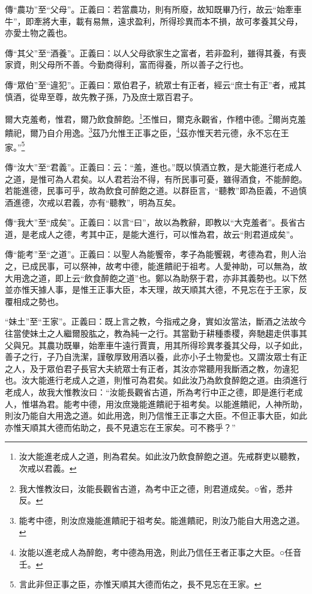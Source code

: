 {\noindent\zhuan{}\fzbyks 傳“農功”至“父母”。正義曰：若當農功，則有所廢，故知既畢乃行，故云“始牽車牛”，即牽將大車，載有易無，遠求盈利，所得珍異而本不損，故可孝養其父母，亦愛土物之義也。 \par}

{\noindent\zhuan{}\fzbyks 傳“其父”至“酒養”。正義曰：以人父母欲家生之富者，若非盈利，雖得其養，有喪家資，則父母所不善。今勤商得利，富而得養，所以善子之行也。 \par}

{\noindent\zhuan{}\fzbyks 傳“眾伯”至“違犯”。正義曰：眾伯君子，統眾士有正者，經云“庶士有正”者，戒其慎酒，從卑至尊，故先教子孫，乃及庶士眾百君子。 \par}

爾大克羞耇，惟君，爾乃飲食醉飽。\footnote{汝大能進老成人之道，則為君矣。如此汝乃飲食醉飽之道。先戒群吏以聽教，次戒以君義。}丕惟曰，爾克永觀省，作稽中德。\footnote{我大惟教汝曰，汝能長觀省古道，為考中正之德，則君道成矣。○省，悉井反。}爾尚克羞饋祀，爾乃自介用逸。\footnote{能考中德，則汝庶幾能進饋祀于祖考矣。能進饋祀，則汝乃能自大用逸之道。}茲乃允惟王正事之臣，\footnote{汝能以進老成人為醉飽，考中德為用逸，則此乃信任王者正事之大臣。○任音壬。}茲亦惟天若元德，永不忘在王家。”\footnote{言此非但正事之臣，亦惟天順其大德而佑之，長不見忘在王家。}

{\noindent\zhuan{}\fzbyks 傳“汝大”至“君義”。正義曰：云：“羞，進也。”既以慎酒立教，是大能進行老成人之道，是惟可為人君矣。以人君若治不得，有所民事可憂，雖得酒食，不能醉飽。若能進德，民事可乎，故為飲食可醉飽之道。以群臣言，“聽教”即為臣義，不過慎酒進德，次戒以君義，亦有“聽教”，明為互矣。 \par}

{\noindent\zhuan{}\fzbyks 傳“我大”至“成矣”。正義曰：以言“曰”，故以為教辭，即教以“大克羞者”。長省古道，是老成人之德，考其中正，是能大進行，可以惟為君，故云“則君道成矣”。 \par}

{\noindent\zhuan{}\fzbyks 傳“能考”至“之道”。正義曰：以聖人為能饗帝，孝子為能饗親，考德為君，則人治之，已成民事，可以祭神，故考中德，能進饋祀于祖考。人愛神助，可以無為，故大用逸之道，即上云“飲食醉飽之道”也。鄭以為助祭于君，亦非其義勢也。以下然並亦惟天據人事，是惟王正事大臣，本天理，故天順其大德，不見忘在于王家，反覆相成之勢也。 \par}

{\noindent\shu{}\fzkt “妹土”至“王家”。正義曰：既上言之教，今指戒之身，實如汝當法，斷酒之法故今往當使妹土之人繼爾股肱之，教為純一之行。其當勤于耕種黍稷，奔馳趨走供事其父與兄。其農功既畢，始牽車牛遠行賈賣，用其所得珍異孝養其父母，以子如此，善子之行，子乃自洗潔，謹敬厚致用酒以養，此亦小子土物愛也。又謂汝眾士有正之人，及于眾伯君子長官大夫統眾士有正者，其汝亦常聽用我斷酒之教，勿違犯也。汝大能進行老成人之道，則惟可為君矣。如此汝乃為飲食醉飽之道。由須進行老成人，故我大惟教汝曰：“汝能長觀省古道，所為考行中正之德，即是進行老成人，惟堪為君。能考中德，用汝庶幾能進饋祀于祖考矣。以能進饋祀，人神所助，則汝乃能自大用逸之道。如此用逸，則乃信惟王正事之大臣。不但正事大臣，如此亦惟天順其大德而佑助之，長不見遺忘在王家矣。可不務乎？” \par}

